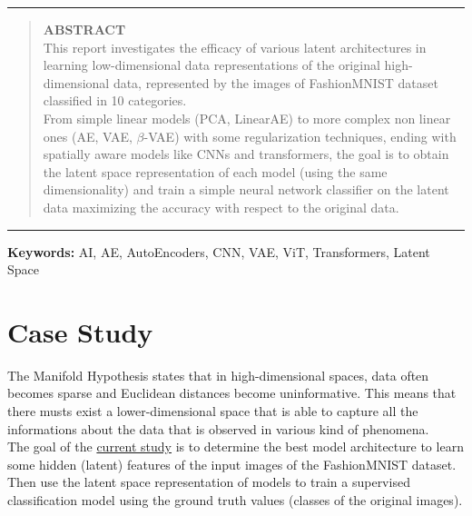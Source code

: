 \documentclass[preprint]{main}
\author[1]{Damiano Fumagalli}
\affil[1]{Università degli Studi di Udine\\ \texttt{\EMAIL}}
\begin{document}
\onecolumn
\date{A.A 2025-2026}
\maketitle

\begin{center}
    \noindent\rule{.9\textwidth}{.4pt}
\end{center}

\begin{abstract}
    \noindent\textbf{\large ABSTRACT} \\ 
    \noindent This report investigates the efficacy of various latent architectures in learning low-dimensional data representations of the original high-dimensional data, represented by the images of FashionMNIST dataset classified in 10 categories. \\
    \noindent From simple linear models (PCA, LinearAE) to more complex non linear ones (AE, VAE, $\beta$-VAE) with some regularization techniques, ending with spatially aware models like CNNs and transformers, the goal is to obtain the latent space representation of each model (using the same dimensionality) and train a simple neural network classifier on the latent data maximizing the accuracy with respect to the original data.
\end{abstract}

\begin{center}
    \noindent\rule{.9\textwidth}{.4pt}
\end{center}
  \textbf{Keywords:} AI, AE, AutoEncoders, CNN, VAE, ViT, Transformers, Latent Space


\clearpage





\section{Case Study}
The Manifold Hypothesis states that in high-dimensional spaces, data often becomes sparse  and Euclidean distances become uninformative. 
This means that there musts exist a lower-dimensional space that is able to capture all the informations about the data that is observed in various kind of phenomena. \\
The goal of the \href{https://github.com/DamiFuma02/CurseOfDimensionality}{current study} \cite{repo_project} is to determine the best model architecture to learn some hidden (latent) features of the input images of the FashionMNIST dataset.
Then use the latent space representation of models to train a supervised classification model using the ground truth values (classes of the original images).
\end{document}
